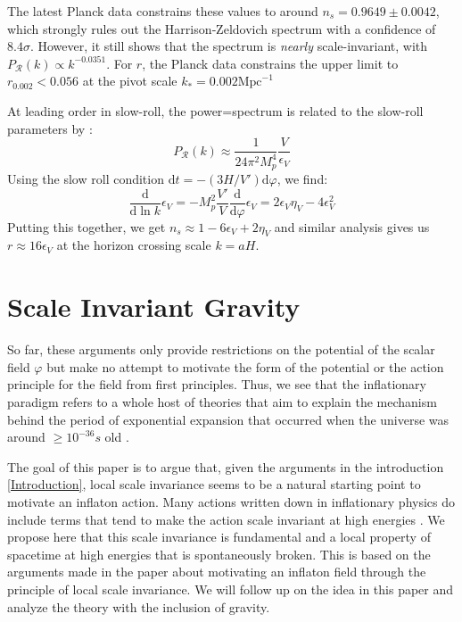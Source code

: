 \documentclass[aps,prd,reprint,preprintnumbers,showpacs,floatfix,nofootinbib,superscript address]{revtex4-2}
\begin{document}
The latest Planck data \cite{collaboration_planck_2020} constrains these values to around $n_s = 0.9649 \pm 0.0042$, which strongly rules out the Harrison‑Zeldovich spectrum with a confidence of $8.4\sigma$. However, it still shows that the spectrum is  \textit{nearly} scale-invariant, with $P_\mathcal{R}(k) \propto k^{-0.0351}$. For $r$, the Planck data constrains the upper limit to $r_{0.002} < 0.056$ at the pivot scale $k_* =0.002 \text{Mpc}^{-1}$

At leading order in slow-roll, the power=spectrum is related to the slow-roll parameters by \cite{liddle_cosmological_2000}:
\begin{equation}
    P_\mathcal{R}(k) \approx \frac{1}{24\pi^2 M_p^4} \frac{V}{\epsilon_V}
\end{equation}
Using the slow roll condition $\text{d}t = -(3H/V') \text{d}\varphi$, we find:
\begin{equation}
    \frac{\text{d}}{\text{d} \ln k} \epsilon_V = -M_p^2 \frac{V'}{V}\frac{\text{d}}{\text{d}\varphi}\epsilon_V = 2\epsilon_V\eta_V - 4\epsilon_V^2
\end{equation}
Putting this together, we get $n_s \approx 1 -6\epsilon_V +2\eta_V$ and similar analysis \cite{baumann2012tasilecturesinflation} gives us $r \approx 16 \epsilon_V$ at the horizon crossing scale $k = aH$.


\section{Scale Invariant Gravity} \label{Scale Invariant Gravity}
So far, these arguments only provide restrictions on the potential of the scalar field $\varphi$ but make no attempt to motivate the form of the potential or the action principle for the field from first principles. Thus, we see that the inflationary paradigm refers to a whole host of theories that aim to explain the mechanism behind the period of exponential expansion that occurred when the universe was around $\geq 10^{-36}s$ old \cite{Mukhanov:2005sc, Baumann_2022}.

The goal of this paper is to argue that, given the arguments in the introduction \ref{Introduction}, local scale invariance seems to be a natural starting point to motivate an inflaton action. Many actions written down in inflationary physics do include terms that tend to make the action scale invariant at high energies \cite{STAROBINSKY198099, karananas_geometrical_2016, Salvio_2022, Karananas:2025xcv, ferreira_inflation_2018, ferreira_inertial_2018, ferreira_weyl_2017, csaki_inflation_2014, rubio_emergent_2017}. We propose here that this scale invariance is fundamental and a local property of spacetime at high energies that is spontaneously broken. This is based on the arguments made in the paper  \cite{barker2024poincaregaugetheoryconformal} about motivating an inflaton field through the principle of local scale invariance. We will follow up on the idea in this paper and analyze the theory with the inclusion of gravity.
\end{document}

